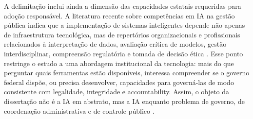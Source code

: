 \documentclass[12pt,a4paper]{article}
\begin{document}
A delimitação inclui ainda a dimensão das capacidades estatais requeridas para adoção responsável. A literatura recente sobre competências em IA na gestão pública indica que a implementação de sistemas inteligentes depende não apenas de infraestrutura tecnológica, mas de repertórios organizacionais e profissionais relacionados à interpretação de dados, avaliação crítica de modelos, gestão interdisciplinar, compreensão regulatória e tomada de decisão ética \autocite{melo2026competencias}. Esse ponto restringe o estudo a uma abordagem institucional da tecnologia: mais do que perguntar quais ferramentas estão disponíveis, interessa compreender se o governo federal dispõe, ou precisa desenvolver, capacidades para governá-las de modo consistente com legalidade, integridade e accountability. Assim, o objeto da dissertação não é a IA em abstrato, mas a IA enquanto problema de governo, de coordenação administrativa e de controle público \autocite{melo2026competencias} \autocite{sigfrids2022how} \autocite{mkander2023auditing}.
\end{document}
